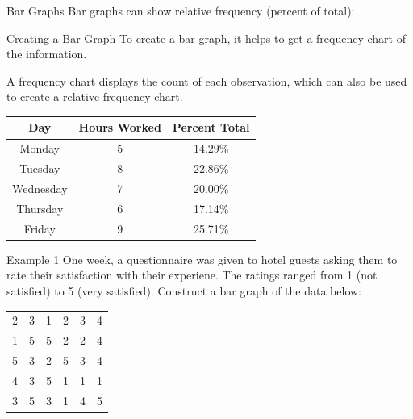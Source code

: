 \documentclass[t]{beamer}
\begin{document}
\begin{frame}{Bar Graphs}
Bar graphs can show relative frequency (percent of total):	\newline\\
\begin{center}
\end{center}
\end{frame}

\begin{frame}{Creating a Bar Graph}
To create a bar graph, it helps to get a frequency chart of the information. \newline\\	\pause

A frequency chart displays the count of each observation, which can also be used to create a relative frequency chart.	\newline\\	\pause
\begin{center}
\begin{tabular}{c|c|c}
\textbf{Day} & \textbf{Hours Worked} & \textbf{Percent Total} \\ \hline
Monday 		& 	5	&	14.29\%	\\
Tuesday 	& 	8	&	22.86\%	\\
Wednesday	&	7	&	20.00\%	\\
Thursday	&	6	&	17.14\%	\\
Friday		&	9	&	25.71\%	\\
\end{tabular}
\end{center}
\end{frame}

\begin{frame}{Example 1}
One week, a questionnaire was given to hotel guests asking them to rate their satisfaction with their experiene. The ratings ranged from 1 (not satisfied) to 5 (very satisfied). Construct a bar graph of the data below:	\newline\\
\begin{center}
\begin{tabular}{cccccc}
2&3&1&2&3&4\\
1&5&5&2&2&4\\
5&3&2&5&3&4\\
4&3&5&1&1&1\\
3&5&3&1&4&5
\end{tabular}
\end{center}
\end{frame}
\end{document}
